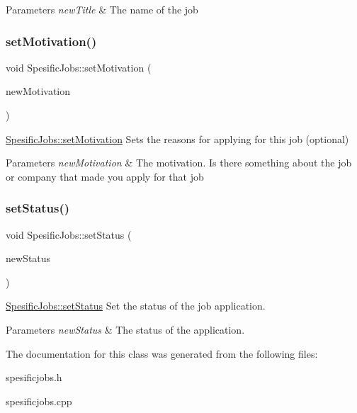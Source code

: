\begin{DoxyParams}{Parameters}
{\em new\+Title} & The name of the job \\
\hline
\end{DoxyParams}
\mbox{\label{class_spesific_jobs_a39df1f364b1ca8e3059094708f01983c}} 
\subsubsection{\texorpdfstring{set\+Motivation()}{setMotivation()}}
{\footnotesize\ttfamily void Spesific\+Jobs\+::set\+Motivation (\begin{DoxyParamCaption}\item[{Q\+String}]{new\+Motivation }\end{DoxyParamCaption})}



\mbox{\hyperlink{class_spesific_jobs_a39df1f364b1ca8e3059094708f01983c}{Spesific\+Jobs\+::set\+Motivation}} Sets the reasons for applying for this job (optional) 


\begin{DoxyParams}{Parameters}
{\em new\+Motivation} & The motivation. Is there something about the job or company that made you apply for that job \\
\hline
\end{DoxyParams}
\mbox{\label{class_spesific_jobs_a439307a28196221b7e3877983077812f}} 
\subsubsection{\texorpdfstring{set\+Status()}{setStatus()}}
{\footnotesize\ttfamily void Spesific\+Jobs\+::set\+Status (\begin{DoxyParamCaption}\item[{Q\+String}]{new\+Status }\end{DoxyParamCaption})}



\mbox{\hyperlink{class_spesific_jobs_a439307a28196221b7e3877983077812f}{Spesific\+Jobs\+::set\+Status}} Set the status of the job application. 


\begin{DoxyParams}{Parameters}
{\em new\+Status} & The status of the application. \\
\hline
\end{DoxyParams}


The documentation for this class was generated from the following files\+:\begin{DoxyCompactItemize}
\item 
spesificjobs.\+h\item 
spesificjobs.\+cpp\end{DoxyCompactItemize}
